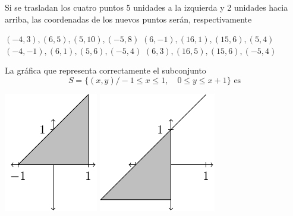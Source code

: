 \documentclass[10pt,letterpaper,addpoints]{exam}
\begin{document}
\begin{multicols}{2}
\begin{questions}
\begin{oneparchoices}
        
\end{oneparchoices}
\question Si se trasladan los cuatro puntos 5 unidades a la izquierda y 2 unidades hacia arriba, las coordenadas de los nuevos puntos serán, respectivamente
\begin{choices}
  \CorrectChoice $(-4,3), (6,5), (5,10), (-5,8)$
  \choice $(6,-1), (16,1), (15,6), (5,4)$
  \choice $(-4,-1), (6,1), (5,6), (-5,4)$
  \choice $(6,3), (16,5), (15,6), (-5,4)$
\end{choices}
  \question La gráfica que representa correctamente el subconjunto \[ S=\{(x,y)/ -1\leq x\leq 1, \quad 0\leq y \leq x+1\} \text{ es} \]
\begin{choices}
\begin{multicols}{2}
\CorrectChoice \includegraphics[scale=.75]{Images/desigA.pdf} 
\choice \includegraphics[scale=.75]{Images/desigB.pdf} 

\end{multicols}
\end{choices}
\end{questions}
\end{multicols}
\end{document}
